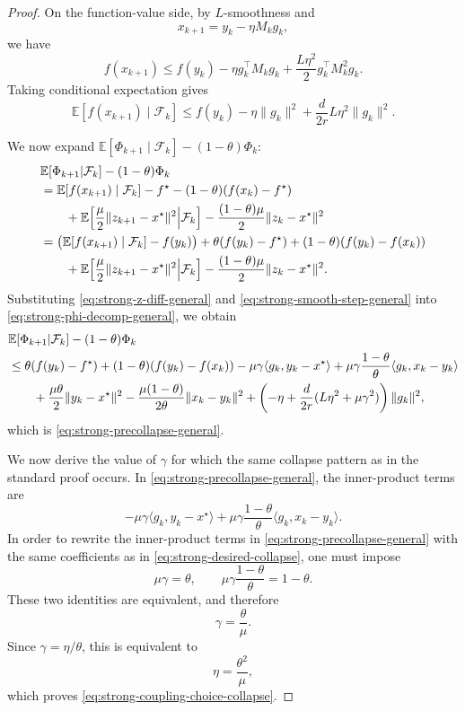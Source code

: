\documentclass[10pt,a4paper]{amsart}
\begin{document}
\begin{proof}
On the function-value side, by \(L\)-smoothness and
\[
x_{k+1}=y_k-\eta M_k g_k,
\]
we have
\[
f(x_{k+1})
\le
f(y_k)-\eta g_k^\top M_k g_k+\frac{L\eta^2}{2}g_k^\top M_k^2 g_k.
\]
Taking conditional expectation gives
\begin{equation}
\mathbb E[f(x_{k+1})\mid \mathcal F_k]
\le
f(y_k)-\eta\|g_k\|^2+\frac{d}{2r}L\eta^2\|g_k\|^2.
\label{eq:strong-smooth-step-general}
\end{equation}

We now expand \(\mathbb E[\Phi_{k+1}\mid\mathcal F_k]-(1-\theta)\Phi_k\):
\begin{align}
&\mathbb E\!\left[\Phi_{k+1}\middle|\mathcal F_k\right]-(1-\theta)\Phi_k
\notag\\
&=
\mathbb E[f(x_{k+1})\mid\mathcal F_k]-f^\star-(1-\theta)(f(x_k)-f^\star)
\notag\\
&\qquad
+\mathbb E\!\left[
\frac{\mu}{2}\|z_{k+1}-x^\star\|^2
\middle|\mathcal F_k
\right]
-\frac{(1-\theta)\mu}{2}\|z_k-x^\star\|^2
\notag\\
&=
\bigl(\mathbb E[f(x_{k+1})\mid\mathcal F_k]-f(y_k)\bigr)
+\theta(f(y_k)-f^\star)
+(1-\theta)(f(y_k)-f(x_k))
\notag\\
&\qquad
+\mathbb E\!\left[
\frac{\mu}{2}\|z_{k+1}-x^\star\|^2
\middle|\mathcal F_k
\right]
-\frac{(1-\theta)\mu}{2}\|z_k-x^\star\|^2.
\label{eq:strong-phi-decomp-general}
\end{align}
Substituting \eqref{eq:strong-z-diff-general} and \eqref{eq:strong-smooth-step-general} into
\eqref{eq:strong-phi-decomp-general}, we obtain
\begin{align}
&\mathbb E\!\left[\Phi_{k+1}\middle|\mathcal F_k\right]-(1-\theta)\Phi_k
\notag\\
&\le
\theta(f(y_k)-f^\star)
+(1-\theta)(f(y_k)-f(x_k))
-\mu\gamma\langle g_k,y_k-x^\star\rangle
+\mu\gamma\frac{1-\theta}{\theta}\langle g_k,x_k-y_k\rangle
\notag\\
&\qquad
+\frac{\mu\theta}{2}\|y_k-x^\star\|^2
-\frac{\mu(1-\theta)}{2\theta}\|x_k-y_k\|^2
+\left(
-\eta+\frac{d}{2r}(L\eta^2+\mu\gamma^2)
\right)\|g_k\|^2,
\end{align}
which is \eqref{eq:strong-precollapse-general}.

We now derive the value of \(\gamma\) for which the same collapse pattern as in the
standard proof occurs. In \eqref{eq:strong-precollapse-general}, the inner-product terms are
\[
-\mu\gamma\langle g_k,y_k-x^\star\rangle
+\mu\gamma\frac{1-\theta}{\theta}\langle g_k,x_k-y_k\rangle.
\]
In order to rewrite the inner-product terms in \eqref{eq:strong-precollapse-general}
with the same coefficients as in \eqref{eq:strong-desired-collapse}, one must impose
\[
\mu\gamma=\theta,
\qquad
\mu\gamma\frac{1-\theta}{\theta}=1-\theta.
\]
These two identities are equivalent, and therefore
\[
\gamma=\frac{\theta}{\mu}.
\]
Since \(\gamma=\eta/\theta\), this is equivalent to
\[
\eta=\frac{\theta^2}{\mu},
\]
which proves \eqref{eq:strong-coupling-choice-collapse}.


\end{proof}
\end{document}
